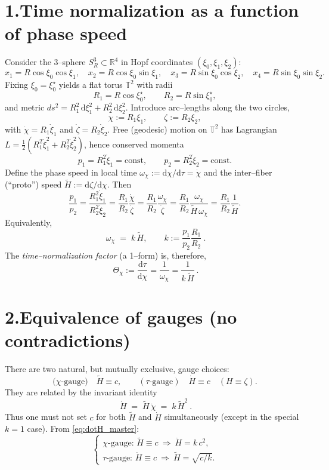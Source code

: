 \documentclass[12pt,a4paper]{article}
\newcommand{\tH}{\tilde{H}}
\newcommand{\dd}{\mathrm{d}}
\newcommand{\R}{\mathbb{R}}
\newcommand{\T}{\mathbb{T}}
\begin{document}

\section*{1.\;Time normalization as a function of phase speed}

Consider the 3--sphere $S^3_R\subset\R^4$ in Hopf coordinates $(\xi_0,\xi_1,\xi_2)$:
\[
x_1=R\cos\xi_0\cos\xi_1,\quad
x_2=R\cos\xi_0\sin\xi_1,\quad
x_3=R\sin\xi_0\cos\xi_2,\quad
x_4=R\sin\xi_0\sin\xi_2.
\]
Fixing $\xi_0=\xi_0^\star$ yields a flat torus $\T^2$ with radii
\[
R_1=R\cos\xi_0^\star,\qquad R_2=R\sin\xi_0^\star,
\]
and metric $ds^2=R_1^2\,\dd\xi_1^2+R_2^2\,\dd\xi_2^2$.
Introduce arc--lengths along the two circles,
\[
\chi:=R_1\xi_1,\qquad \zeta:=R_2\xi_2,
\]
with $\dot\chi=R_1\dot\xi_1$ and $\dot\zeta=R_2\dot\xi_2$. 
Free (geodesic) motion on $\T^2$ has Lagrangian $L=\tfrac12(R_1^2\dot\xi_1^2+R_2^2\dot\xi_2^2)$, hence conserved momenta
\[
p_1=R_1^2\dot\xi_1=\text{const},\qquad p_2=R_2^2\dot\xi_2=\text{const}.
\]
Define the phase speed in local time $\omega_\chi:=\dd\chi/\dd\tau=\dot\chi$ and the inter--fiber (``proto'') speed $\tH:=\dd\zeta/\dd\chi$. Then
\[
\frac{p_1}{p_2}=\frac{R_1^2\dot\xi_1}{R_2^2\dot\xi_2}
=\frac{R_1}{R_2}\frac{\dot\chi}{\dot\zeta}
=\frac{R_1}{R_2}\frac{\omega_\chi}{\dot\zeta}
=\frac{R_1}{R_2}\frac{\omega_\chi}{\tH\,\omega_\chi}
=\frac{R_1}{R_2}\frac{1}{\tH}.
\]
Equivalently,
\begin{equation}\label{eq:omega_kH}
\boxed{\ \omega_\chi \;=\; k\,\tH,\qquad k:=\frac{p_1}{p_2}\frac{R_1}{R_2}\ }.
\end{equation}
The \emph{time--normalization factor} (a 1--form) is, therefore,
\begin{equation}\label{eq:Theta}
\boxed{\ \Theta_\chi:=\frac{\dd\tau}{\dd\chi}=\frac{1}{\omega_\chi}=\frac{1}{k\,\tH}\ }.
\end{equation}

\section*{2.\;Equivalence of gauges (no contradictions)}

There are two natural, but mutually exclusive, gauge choices:
\[
\text{(}\chi\text{-gauge)}\quad \tH\equiv c,
\qquad
(\tau\text{-gauge})\quad \dot H\equiv c\quad (H\equiv\zeta).
\]
They are related by the invariant identity
\begin{equation}\label{eq:dotH_master}
\boxed{\ \dot H \;=\; \tH\,\dot\chi \;=\; k\,\tH^2\ }.
\end{equation}
Thus one must not set $c$ for both $\tH$ and $\dot H$ simultaneously (except in the special $k=1$ case). From \eqref{eq:dotH_master}:
\[
\begin{cases}
\text{$\chi$-gauge: } \tH\equiv c \ \Rightarrow\ \dot H = k\,c^2,\\[1mm]
\text{$\tau$-gauge: } \dot H\equiv c \ \Rightarrow\ \tH = \sqrt{c/k}.
\end{cases}
\]
\end{document}
